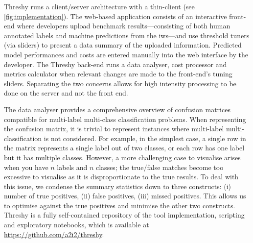 




Threshy runs a client/server architecture with a thin-client (see \cref{fig:implementation}). The web-based application consists of an interactive front-end where developers upload benchmark results---consisting of both human annotated labels and machine predictions from the \gls{iws}---and use threshold tuners (via sliders) to present a data summary of the uploaded information. Predicted model performances and costs are entered manually into the web interface by the developer. The Threshy back-end runs a data analyser, cost processor and metrics calculator when relevant changes are made to the front-end's tuning sliders. Separating the two concerns allows for high intensity processing to be done on the server and not the front end.

The data analyser provides a comprehensive overview of confusion matrices compatible for multi-label multi-class classification problems. When representing the confusion matrix, it is trivial to represent instances where multi-label multi-classification is not considered. For example, in the simplest case, a single row in the matrix represents a single label out of two classes, or each row has one label but it has multiple classes. However, a more challenging case to visualise arises when you have $n$ labels and $n$ classes; the true/false matches become too excessive to visualise as it is disproportionate to the true results.  To deal with this issue, we condense the summary statistics down to three constructs: (i) number of true positives, (ii) false positives, (iii) missed positives. This allows us to optimise against the true positives and minimise the other two constructs. 
Threshy is a fully self-contained repository of the tool implementation, scripting and exploratory notebooks, which is available at \url{https://github.com/a2i2/threshy}.



